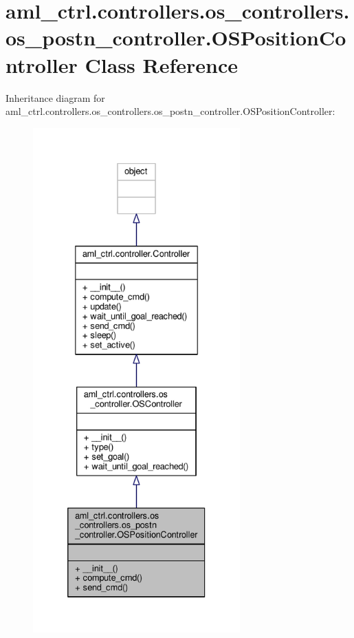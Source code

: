 \hypertarget{classaml__ctrl_1_1controllers_1_1os__controllers_1_1os__postn__controller_1_1_o_s_position_controller}{\section{aml\-\_\-ctrl.\-controllers.\-os\-\_\-controllers.\-os\-\_\-postn\-\_\-controller.\-O\-S\-Position\-Controller Class Reference}
\label{classaml__ctrl_1_1controllers_1_1os__controllers_1_1os__postn__controller_1_1_o_s_position_controller}
}


Inheritance diagram for aml\-\_\-ctrl.\-controllers.\-os\-\_\-controllers.\-os\-\_\-postn\-\_\-controller.\-O\-S\-Position\-Controller\-:\nopagebreak
\begin{figure}[H]
\begin{center}
\leavevmode
\includegraphics[height=550pt]{classaml__ctrl_1_1controllers_1_1os__controllers_1_1os__postn__controller_1_1_o_s_position_controller__inherit__graph}
\end{center}
\end{figure}


